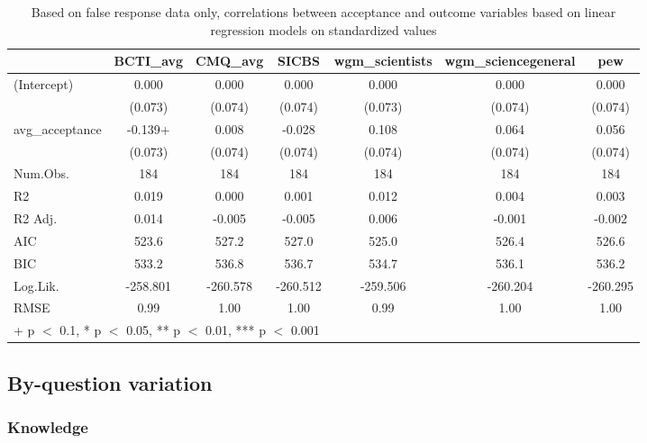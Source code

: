 \documentclass[
  doc,floatsintext]{apa6}
\begin{document}
\begin{table}

\caption{\label{tab:false-response-regression}Based on false response data only, correlations between acceptance and outcome variables based on linear regression models on standardized values}
\centering
\begin{tabular}[t]{lcccccc}
\toprule
  & BCTI\_avg & CMQ\_avg & SICBS & wgm\_scientists & wgm\_sciencegeneral & pew\\
\midrule
(Intercept) & 0.000 & 0.000 & 0.000 & 0.000 & 0.000 & 0.000\\
 & (0.073) & (0.074) & (0.074) & (0.073) & (0.074) & (0.074)\\
avg\_acceptance & -0.139+ & 0.008 & -0.028 & 0.108 & 0.064 & 0.056\\
 & (0.073) & (0.074) & (0.074) & (0.074) & (0.074) & (0.074)\\
\midrule
Num.Obs. & 184 & 184 & 184 & 184 & 184 & 184\\
R2 & 0.019 & 0.000 & 0.001 & 0.012 & 0.004 & 0.003\\
R2 Adj. & 0.014 & -0.005 & -0.005 & 0.006 & -0.001 & -0.002\\
AIC & 523.6 & 527.2 & 527.0 & 525.0 & 526.4 & 526.6\\
BIC & 533.2 & 536.8 & 536.7 & 534.7 & 536.1 & 536.2\\
Log.Lik. & -258.801 & -260.578 & -260.512 & -259.506 & -260.204 & -260.295\\
RMSE & 0.99 & 1.00 & 1.00 & 0.99 & 1.00 & 1.00\\
\bottomrule
\multicolumn{7}{l}{\rule{0pt}{1em}+ p $<$ 0.1, * p $<$ 0.05, ** p $<$ 0.01, *** p $<$ 0.001}\\
\end{tabular}
\end{table}

\subsection{By-question variation}\label{by-question-variation}

\subsubsection{Knowledge}\label{knowledge}
\end{document}
